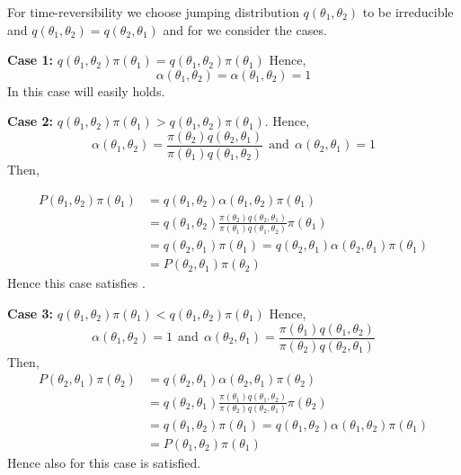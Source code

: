 For time-reversibility we choose jumping distribution $ q(\theta_1,\theta_2) $ to be irreducible and $ q(\theta_1,\theta_2) = q(\theta_2,\theta_1) $ and for  we consider the cases.

\textbf{Case 1:} $ q(\theta_1,\theta_2)\pi(\theta_1) = q(\theta_1,\theta_2)\pi(\theta_1)$
Hence, $$ \alpha(\theta_1,\theta_2) = \alpha(\theta_1,\theta_2) = 1 $$
In this case  will easily holds.

\textbf{Case 2:} $ q(\theta_1,\theta_2)\pi(\theta_1) > q(\theta_1,\theta_2)\pi(\theta_1)$.
Hence,
\[
	\alpha(\theta_1,\theta_2) = \frac{\pi(\theta_2)q(\theta_2,\theta_1)}{\pi(\theta_1)q(\theta_1,\theta_2)} \ \ \text{and} \ \ \alpha(\theta_2,\theta_1) = 1
\]
Then,

\begin{align*}
	P(\theta_1,\theta_2)\pi(\theta_1) & = q(\theta_1,\theta_2)\alpha(\theta_1,\theta_2) \pi(\theta_1)                                                    \\
	                                  & = q(\theta_1,\theta_2) \frac{\pi(\theta_2)q(\theta_2,\theta_1)}{\pi(\theta_1)q(\theta_1,\theta_2)} \pi(\theta_1) \\
	                                  & = q(\theta_2,\theta_1) \pi(\theta_1) = q(\theta_2,\theta_1) \alpha(\theta_2,\theta_1) \pi(\theta_1)              \\
	                                  & = P(\theta_2,\theta_1) \pi(\theta_2)
\end{align*}
Hence this case satisfies .

\textbf{Case 3:} $ q(\theta_1,\theta_2)\pi(\theta_1) < q(\theta_1,\theta_2)\pi(\theta_1)$
Hence,
\[
	\alpha(\theta_1,\theta_2) = 1  \ \ \text{and} \ \  \alpha(\theta_2,\theta_1) = \frac{\pi(\theta_1)q(\theta_1,\theta_2)}{\pi(\theta_2)q(\theta_2,\theta_1)}
\]
Then,
\begin{align*}
	P(\theta_2,\theta_1)\pi(\theta_2) & = q(\theta_2,\theta_1)\alpha(\theta_2,\theta_1)\pi(\theta_2)                                                     \\
	                                  & = q(\theta_2,\theta_1) \frac{\pi(\theta_1)q(\theta_1,\theta_2)}{\pi(\theta_2)q(\theta_2,\theta_1)} \pi(\theta_2) \\
	                                  & = q(\theta_1,\theta_2) \pi(\theta_1) = q(\theta_1,\theta_2) \alpha(\theta_1,\theta_2) \pi(\theta_1)              \\
	                                  & =P(\theta_1,\theta_2) \pi(\theta_1)
\end{align*}
Hence also for this case  is satisfied.

